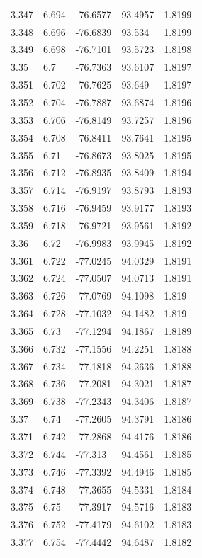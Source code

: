 \begin{tabular}{lllll}
3.347 & 6.694 & -76.6577 & 93.4957 & 1.8199 \\
3.348 & 6.696 & -76.6839 & 93.534 & 1.8199 \\
3.349 & 6.698 & -76.7101 & 93.5723 & 1.8198 \\
3.35 & 6.7 & -76.7363 & 93.6107 & 1.8197 \\
3.351 & 6.702 & -76.7625 & 93.649 & 1.8197 \\
3.352 & 6.704 & -76.7887 & 93.6874 & 1.8196 \\
3.353 & 6.706 & -76.8149 & 93.7257 & 1.8196 \\
3.354 & 6.708 & -76.8411 & 93.7641 & 1.8195 \\
3.355 & 6.71 & -76.8673 & 93.8025 & 1.8195 \\
3.356 & 6.712 & -76.8935 & 93.8409 & 1.8194 \\
3.357 & 6.714 & -76.9197 & 93.8793 & 1.8193 \\
3.358 & 6.716 & -76.9459 & 93.9177 & 1.8193 \\
3.359 & 6.718 & -76.9721 & 93.9561 & 1.8192 \\
3.36 & 6.72 & -76.9983 & 93.9945 & 1.8192 \\
3.361 & 6.722 & -77.0245 & 94.0329 & 1.8191 \\
3.362 & 6.724 & -77.0507 & 94.0713 & 1.8191 \\
3.363 & 6.726 & -77.0769 & 94.1098 & 1.819 \\
3.364 & 6.728 & -77.1032 & 94.1482 & 1.819 \\
3.365 & 6.73 & -77.1294 & 94.1867 & 1.8189 \\
3.366 & 6.732 & -77.1556 & 94.2251 & 1.8188 \\
3.367 & 6.734 & -77.1818 & 94.2636 & 1.8188 \\
3.368 & 6.736 & -77.2081 & 94.3021 & 1.8187 \\
3.369 & 6.738 & -77.2343 & 94.3406 & 1.8187 \\
3.37 & 6.74 & -77.2605 & 94.3791 & 1.8186 \\
3.371 & 6.742 & -77.2868 & 94.4176 & 1.8186 \\
3.372 & 6.744 & -77.313 & 94.4561 & 1.8185 \\
3.373 & 6.746 & -77.3392 & 94.4946 & 1.8185 \\
3.374 & 6.748 & -77.3655 & 94.5331 & 1.8184 \\
3.375 & 6.75 & -77.3917 & 94.5716 & 1.8183 \\
3.376 & 6.752 & -77.4179 & 94.6102 & 1.8183 \\
3.377 & 6.754 & -77.4442 & 94.6487 & 1.8182 \\

\end{tabular}
